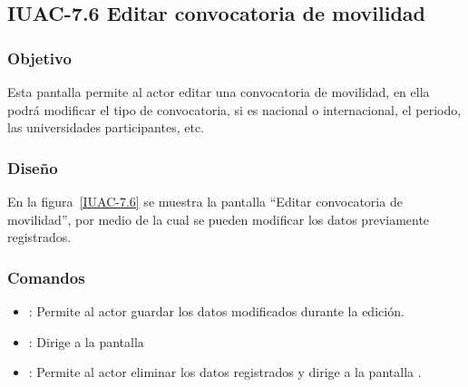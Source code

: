 \subsection{IUAC-7.6 Editar convocatoria de movilidad}

\subsubsection{Objetivo}

Esta pantalla permite al actor  editar una convocatoria de movilidad, en ella podrá modificar el tipo de convocatoria, si es nacional o internacional, el periodo, las universidades participantes, etc.

\subsubsection{Diseño}

En la figura~\ref{IUAC-7.6} se muestra la pantalla ``Editar convocatoria de movilidad'', por medio de la cual se pueden modificar los datos previamente registrados. \\


\subsubsection{Comandos}
\begin{itemize}
	\item {}: Permite al actor guardar los datos modificados durante la edición.
	\item {}: Dirige a la pantalla 
	\item {}: Permite al actor eliminar los datos registrados y dirige a la pantalla .
\end{itemize}
